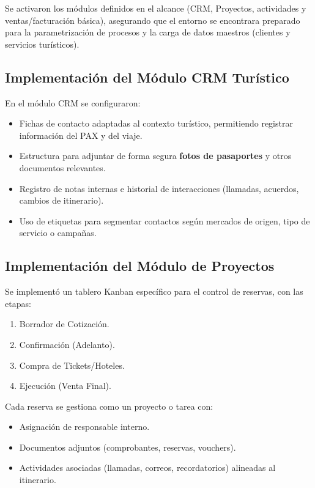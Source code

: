 Se activaron los módulos definidos en el alcance (CRM, Proyectos, actividades y ventas/facturación básica), asegurando que el entorno se encontrara preparado para la parametrización de procesos y la carga de datos maestros (clientes y servicios turísticos).

\subsection{Implementación del Módulo CRM Turístico}

En el módulo CRM se configuraron:

\begin{itemize}
    \item Fichas de contacto adaptadas al contexto turístico, permitiendo registrar información del PAX y del viaje.
    \item Estructura para adjuntar de forma segura \textbf{fotos de pasaportes} y otros documentos relevantes.
    \item Registro de notas internas e historial de interacciones (llamadas, acuerdos, cambios de itinerario).
    \item Uso de etiquetas para segmentar contactos según mercados de origen, tipo de servicio o campañas.
\end{itemize}

\subsection{Implementación del Módulo de Proyectos}

Se implementó un tablero Kanban específico para el control de reservas, con las etapas:

\begin{enumerate}
    \item Borrador de Cotización.
    \item Confirmación (Adelanto).
    \item Compra de Tickets/Hoteles.
    \item Ejecución (Venta Final).
\end{enumerate}

Cada reserva se gestiona como un proyecto o tarea con:

\begin{itemize}
    \item Asignación de responsable interno.
    \item Documentos adjuntos (comprobantes, reservas, vouchers).
    \item Actividades asociadas (llamadas, correos, recordatorios) alineadas al itinerario.
\end{itemize}

